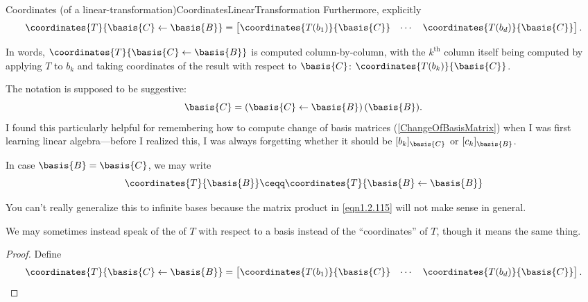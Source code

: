 \begin{thm}{Coordinates (of a linear-transformation)}{CoordinatesLinearTransformation}
	Furthermore, explicitly
	\begin{equation}
		\coordinates{T}{\basis{C}\leftarrow \basis{B}}=\begin{bmatrix}\coordinates{T(b_1)}{\basis{C}} & \cdots & \coordinates{T(b_d)}{\basis{C}}\end{bmatrix}.
	\end{equation}
	\begin{rmk}
		In words, $\coordinates{T}{\basis{C}\leftarrow \basis{B}}$ is computed column-by-column, with the $k^{\text{th}}$ column itself being computed by applying $T$ to $b_k$ and taking coordinates of the result with respect to $\basis{C}$:  $\coordinates{T(b_k)}{\basis{C}}$.
	\end{rmk}
	\begin{rmk}
		The notation is supposed to be suggestive:
		\begin{equation}
			\basis{C}=(\basis{C}\leftarrow \basis{B})\, (\basis{B}).
		\end{equation}
		I found this particularly helpful for remembering how to compute change of basis matrices (\cref{ChangeOfBasisMatrix}) when I was first learning linear algebra---before I realized this, I was always forgetting whether it should be $[b_k]_{\basis{C}}$ or $[c_k]_{\basis{B}}$.
	\end{rmk}
	\begin{rmk}
		In case $\basis{B}=\basis{C}$, we may write
		\begin{equation}
			\coordinates{T}{\basis{B}}\ceqq \coordinates{T}{\basis{B}\leftarrow \basis{B}}
		\end{equation}
	\end{rmk}
	\begin{rmk}
		You can't really generalize this to infinite bases because the matrix product in \eqref{eqn1.2.115} will not make sense in general.
	\end{rmk}
	\begin{rmk}
		We may sometimes instead speak of the  of $T$ with respect to a basis instead of the ``coordinates'' of $T$, though it means the same thing.
	\end{rmk}
	\begin{proof}
		Define
		\begin{equation}
			\coordinates{T}{\basis{C}\leftarrow \basis{B}}=\begin{bmatrix}\coordinates{T(b_1)}{\basis{C}} & \cdots & \coordinates{T(b_d)}{\basis{C}}\end{bmatrix}.
		\end{equation}
		

\end{proof}
\end{thm}
